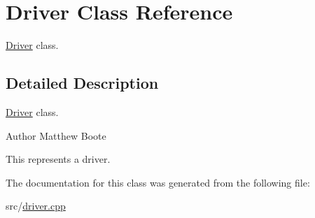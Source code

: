 \hypertarget{classDriver}{}\section{Driver Class Reference}
\label{classDriver}


\hyperlink{classDriver}{Driver} class.  




\subsection{Detailed Description}
\hyperlink{classDriver}{Driver} class. 

\begin{DoxyAuthor}{Author}
Matthew Boote
\end{DoxyAuthor}
This represents a driver. 

The documentation for this class was generated from the following file\+:\begin{DoxyCompactItemize}
\item 
src/\hyperlink{driver_8cpp}{driver.\+cpp}\end{DoxyCompactItemize}
